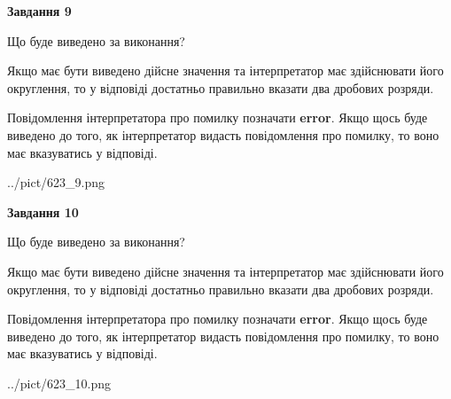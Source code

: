 \documentclass[12pt, ukrainian]{article}
\begin{document}
{\begin {Large}
{\begin {center}\textbf{Завдання 9}\end {center}}\par
Що буде виведено за виконання? \par

Якщо має бути виведено дійсне значення та інтерпретатор має здійснювати його округлення, 
то у відповіді достатньо правильно вказати два дробових розряди.

Повідомлення інтерпретатора про помилку позначати \textbf{error}.
Якщо щось буде виведено до того, як інтерпретатор видасть повідомлення про помилку, 
то воно має вказуватись у відповіді. \par

\begin{center}
	{../pict/623_9.png}
\end{center}
\newpage

{\begin {center}\textbf{Завдання 10}\end {center}}\par
Що буде виведено за виконання? \par

Якщо має бути виведено дійсне значення та інтерпретатор має здійснювати його округлення, 
то у відповіді достатньо правильно вказати два дробових розряди.

Повідомлення інтерпретатора про помилку позначати \textbf{error}.
Якщо щось буде виведено до того, як інтерпретатор видасть повідомлення про помилку, 
то воно має вказуватись у відповіді. \par

\begin{center}
	{../pict/623_10.png}
\end{center}
\newpage

\end {Large}}
\end{document}
